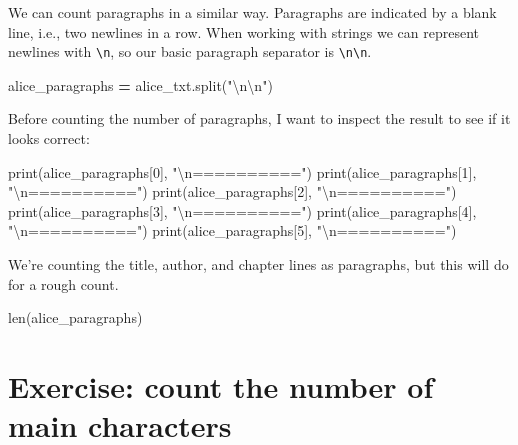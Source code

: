 \documentclass[]{book}
\newenvironment{Shaded}{\begin{snugshade}}{\end{snugshade}}
\newcommand{\DecValTok}[1]{\textcolor[rgb]{0.00,0.00,0.81}{#1}}
\newcommand{\CharTok}[1]{\textcolor[rgb]{0.31,0.60,0.02}{#1}}
\newcommand{\StringTok}[1]{\textcolor[rgb]{0.31,0.60,0.02}{#1}}
\newcommand{\OperatorTok}[1]{\textcolor[rgb]{0.81,0.36,0.00}{\textbf{#1}}}
\newcommand{\BuiltInTok}[1]{#1}
\newcommand{\NormalTok}[1]{#1}
\begin{document}
We can count paragraphs in a similar way. Paragraphs are indicated by a
blank line, i.e., two newlines in a row. When working with strings we
can represent newlines with \texttt{\textbackslash{}n}, so our basic
paragraph separator is \texttt{\textbackslash{}n\textbackslash{}n}.

\begin{Shaded}
\begin{Highlighting}[]
\NormalTok{alice_paragraphs }\OperatorTok{=}\NormalTok{ alice_txt.split(}\StringTok{"}\CharTok{\textbackslash{}n\textbackslash{}n}\StringTok{"}\NormalTok{)}
\end{Highlighting}
\end{Shaded}

Before counting the number of paragraphs, I want to inspect the result
to see if it looks correct:

\begin{Shaded}
\begin{Highlighting}[]
\BuiltInTok{print}\NormalTok{(alice_paragraphs[}\DecValTok{0}\NormalTok{], }\StringTok{"}\CharTok{\textbackslash{}n}\StringTok{=========="}\NormalTok{)}
\BuiltInTok{print}\NormalTok{(alice_paragraphs[}\DecValTok{1}\NormalTok{], }\StringTok{"}\CharTok{\textbackslash{}n}\StringTok{=========="}\NormalTok{)}
\BuiltInTok{print}\NormalTok{(alice_paragraphs[}\DecValTok{2}\NormalTok{], }\StringTok{"}\CharTok{\textbackslash{}n}\StringTok{=========="}\NormalTok{)}
\BuiltInTok{print}\NormalTok{(alice_paragraphs[}\DecValTok{3}\NormalTok{], }\StringTok{"}\CharTok{\textbackslash{}n}\StringTok{=========="}\NormalTok{)}
\BuiltInTok{print}\NormalTok{(alice_paragraphs[}\DecValTok{4}\NormalTok{], }\StringTok{"}\CharTok{\textbackslash{}n}\StringTok{=========="}\NormalTok{)}
\BuiltInTok{print}\NormalTok{(alice_paragraphs[}\DecValTok{5}\NormalTok{], }\StringTok{"}\CharTok{\textbackslash{}n}\StringTok{=========="}\NormalTok{)}
\end{Highlighting}
\end{Shaded}

We're counting the title, author, and chapter lines as paragraphs, but
this will do for a rough count.

\begin{Shaded}
\begin{Highlighting}[]
\BuiltInTok{len}\NormalTok{(alice_paragraphs)}
\end{Highlighting}
\end{Shaded}

\section{Exercise: count the number of main
characters}\label{exercise-count-the-number-of-main-characters}
\end{document}
